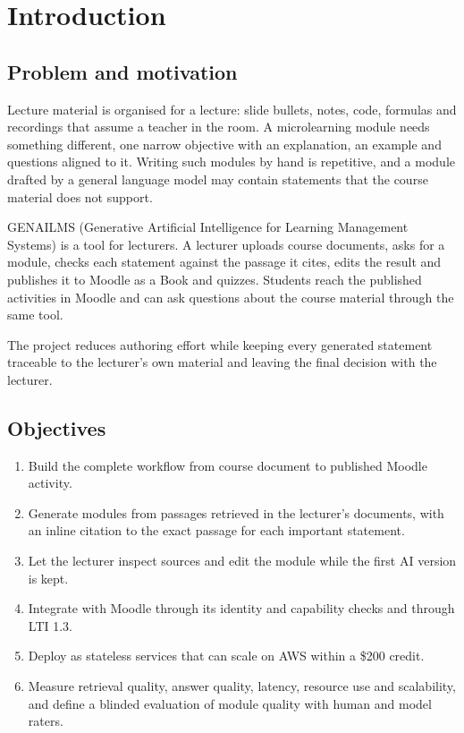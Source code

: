 \section{Introduction}\label{sec:introduction}
\subsection{Problem and motivation}
Lecture material is organised for a lecture: slide bullets, notes, code, formulas and recordings that assume a teacher in the room. A microlearning module needs something different, one narrow objective with an explanation, an example and questions aligned to it. Writing such modules by hand is repetitive, and a module drafted by a general language model may contain statements that the course material does not support.

GENAILMS (Generative Artificial Intelligence for Learning Management Systems) is a tool for lecturers. A lecturer uploads course documents, asks for a module, checks each statement against the passage it cites, edits the result and publishes it to Moodle as a Book and quizzes. Students reach the published activities in Moodle and can ask questions about the course material through the same tool.

The project reduces authoring effort while keeping every generated statement traceable to the lecturer's own material and leaving the final decision with the lecturer.
\subsection{Objectives}
\begin{enumerate}[label=O\arabic*.,leftmargin=*,nosep]
\item Build the complete workflow from course document to published Moodle activity.
\item Generate modules from passages retrieved in the lecturer's documents, with an inline citation to the exact passage for each important statement.
\item Let the lecturer inspect sources and edit the module while the first AI version is kept.
\item Integrate with Moodle through its identity and capability checks and through LTI 1.3.
\item Deploy as stateless services that can scale on AWS within a \$200 credit.
\item Measure retrieval quality, answer quality, latency, resource use and scalability, and define a blinded evaluation of module quality with human and model raters.
\end{enumerate}
